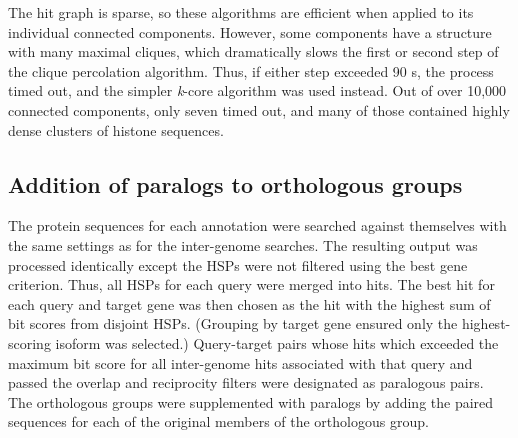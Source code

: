 \documentclass[10pt,letterpaper]{article}
\begin{document}
The hit graph is sparse, so these algorithms are efficient when applied to its individual connected components. However, some components have a structure with many maximal cliques, which dramatically slows the first or second step of the clique percolation algorithm. Thus, if either step exceeded 90 s, the process timed out, and the simpler \textit{k}-core algorithm was used instead. Out of over 10,000 connected components, only seven timed out, and many of those contained highly dense clusters of histone sequences.

\subsection*{Addition of paralogs to orthologous groups}
The protein sequences for each annotation were searched against themselves with the same settings as for the inter-genome searches. The resulting output was processed identically except the HSPs were not filtered using the best gene criterion. Thus, all HSPs for each query were merged into hits. The best hit for each query and target gene was then chosen as the hit with the highest sum of bit scores from disjoint HSPs. (Grouping by target gene ensured only the highest-scoring isoform was selected.) Query-target pairs whose hits which exceeded the maximum bit score for all inter-genome hits associated with that query and passed the overlap and reciprocity filters were designated as paralogous pairs. The orthologous groups were supplemented with paralogs by adding the paired sequences for each of the original members of the orthologous group.
\end{document}
